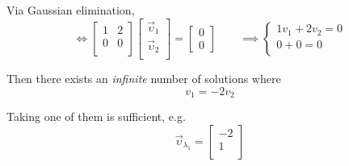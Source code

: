 \begin{remark}
\begin{enumerate}
            Via Gaussian elimination,
            \begin{equation}
                \Leftrightarrow 
                \begin{bmatrix}
                    1 & 2 \\
                    0 & 0 \\
                \end{bmatrix}
                \begin{bmatrix}
                    {\overrightarrow{\upsilon}}_{1} \\
                    {\overrightarrow{\upsilon}}_{2} \\
                \end{bmatrix}
                =
                \begin{bmatrix}
                    0 \\
                    0
                \end{bmatrix}
                \quad\quad \implies
                \left\{
                \begin{array}{l}
                    1 v_1 + 2 v_2 = 0 \\
                    0 + 0 = 0 \\
                \end{array}
                \right.
            \end{equation}
            
            Then there exists an \textit{infinite} number of solutions where
            \begin{equation}
                v_1 = -2 v_2
            \end{equation}
            
            Taking one of them is sufficient, e.g.
            \begin{equation}
                {\overrightarrow{\upsilon}}_{\lambda_1}
                = 
                \begin{bmatrix}
                    -2 \\
                    1  \\
                \end{bmatrix}
            \end{equation}
            

\end{enumerate}
\end{remark}
